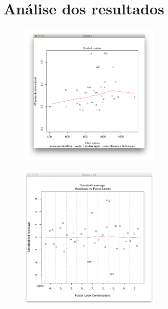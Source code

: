 \section{An\'alise dos resultados}
\label{sec:resultados}





\begin{figure}[t]
    \centering
    \includegraphics[width=0.6\textwidth]{images/grafico2.png}
    \caption{}
    \label{fig:grafico2}
\end{figure}

\begin{figure}[t]
    \centering
    \includegraphics[width=0.6\textwidth]{images/grafico3.png}
    \caption{}
    \label{fig:grafico3}
\end{figure}

